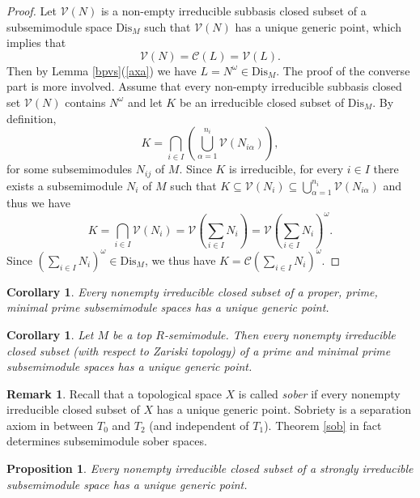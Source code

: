 \documentclass[12pt,english]{smfart}
\newtheorem{proposition}[theorem]{Proposition}
\newtheorem{corollary}[theorem]{Corollary}
\theoremstyle{definition}
\newtheorem{remark}[theorem]{Remark}
\begin{document}
\begin{proof}
Let $\mathcal{V}(N)$ is a non-empty irreducible subbasis closed subset of a subsemimodule space $\mathrm{Dis}_M$ such that $\mathcal{V}(N)$ has a unique generic point, which implies that 
\[\mathcal{V}(N)=\mathcal{C}(L)=\mathcal{V}(L).\] Then by Lemma \ref{bpvs}(\ref{axa}) we have $L=N^{\omega}\in \mathrm{Dis}_M$. 
The proof of the converse part is more involved. Assume that every non-empty irreducible subbasis  closed set $\mathcal{V}(N)$ contains $N^{\omega}$ and let $K$ be an irreducible closed subset of $\mathrm{Dis}_M$. By definition, \[K=\bigcap_{i\in I}\left( \bigcup_{\alpha=1}^{n_i} \mathcal{V}(N_{i\alpha})\right),\] for some  subsemimodules $N_{ij}$ of $M$. Since $K$ is irreducible, for every $i\in I$ there exists a subsemimodule $N_i$ of $M$ such that $K\subseteq \mathcal{V}(N_i)\subseteq \bigcup_{\alpha=1}^{n_i} \mathcal{V}(N_{i\alpha})$ and thus we have  $$K=\bigcap_{i\in I}\mathcal{V}(N_i)=\mathcal{V}\left(\sum_{i\in I}N_i \right)=\mathcal{V}\left(\sum_{i\in I}N_i \right)^{\omega}.$$ Since $\left(\sum_{i\in I}N_i \right)^{\omega}\in \mathrm{Dis}_M$, we thus have $K=\mathcal{C}\left(\sum_{i\in I}N_i \right)^{\omega}$.  
\end{proof}

\begin{corollary}
Every nonempty irreducible closed subset of a proper, prime, minimal prime subsemimodule spaces has a unique generic point.
\end{corollary}

\begin{corollary}
Let $M$ be a top $R$-semimodule. Then every nonempty irreducible closed subset (with respect to Zariski topology) of a prime and minimal prime subsemimodule spaces has a unique generic point.	
\end{corollary}

\begin{remark}
Recall that a topological space $X$ is called \emph{sober} if every nonempty irreducible closed subset of $X$ has a unique generic point. Sobriety is a separation axiom in between $T_0$ and $T_2$ (and independent of $T_1$). Theorem \ref{sob} in fact determines subsemimodule sober spaces.
\end{remark}

\begin{proposition}\label{sirrs} 
Every nonempty irreducible closed subset of a strongly irreducible subsemimodule space has a unique generic point.
\end{proposition}
\end{document}
